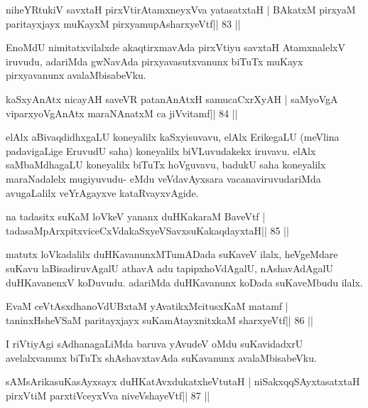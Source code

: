 \begin{shl}
niheYRtukiV savxtaH pirxVtirAtamxneyxVva yatasatxtaH |
BAkatxM pirxyaM paritayxjayx muKayxM pirxyamupAsharxyeVtf\hfill || 83 ||
\end{shl}

\begin{artha}
EnoMdU nimitatxvilalxde akaqtirxmavAda pirxVtiyu savxtaH AtamxnalelxV iruvudu, adariMda gwNavAda pirxyavasutxvanunx biTuTx muKayx pirxyavanunx avalaMbisabeVku.
\end{artha}

\begin{shl}
kaSxyAnAtx nicayAH saveVR patanAnAtxH samucaCxrXyAH |
saMyoVgA viparxyoVgAnAtx maraNAnatxM ca jiVvitamf\hfill || 84 ||
\end{shl}

\begin{artha}
elAlx aBivaqdidhxgaLU koneyalilx kaSxyisuvavu, elAlx ErikegaLU (meVlina
padavigaLige EruvudU saha) koneyalilx biVLuvudakekx iruvavu. elAlx
saMbaMdhagaLU koneyalilx biTuTx hoVguvavu, badukU saha koneyalilx
maraNadalelx mugiyuvudu- eMdu veVdavAyxsara vacanaviruvudariMda
avugaLalilx veYrAgayxve kataRvayxvAgide.
\end{artha}

\begin{shl}
na tadasitx suKaM loVkeV yananx duHKakaraM BaveVtf |
tadasaMpArxpitxviceCxVdakaSxyeVSavxsuKakaqdayxtaH\hfill || 85 ||
\end{shl}

\begin{artha}
matutx loVkadalilx duHKavanunxMTumADada suKaveV ilalx, heVgeMdare suKavu laBisadiruvAgalU athavA adu tapipxhoVdAgalU, nAshavAdAgalU duHKavanenxV koDuvudu. adariMda duHKavanunx koDada suKaveMbudu ilalx.
\end{artha}

\begin{shl}
EvaM ceVtAsxdhanoVdUBxtaM yAvatikxMcitusxKaM matamf |
taninxHsheVSaM paritayxjayx suKamAtayxnitxkaM sharxyeVtf\hfill || 86 ||
\end{shl}

\begin{artha}
I riVtiyAgi sAdhanagaLiMda baruva yAvudeV oMdu suKavidadxrU avelalxvanunx biTuTx shAshavxtavAda suKavanunx avalaMbisabeVku.
\end{artha}

\begin{shl}
sAMsArikasuKasAyxsayx duHKatAvxdukatxheVtutaH |
niSakxqqSAyxtasatxtaH pirxVtiM parxtiVceyxVva niveVshayeVtf\hfill || 87 ||
\end{shl}

